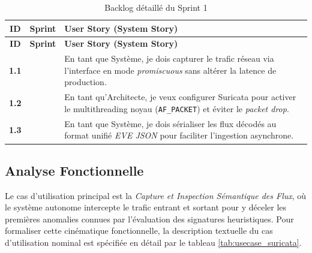 \renewcommand{\arraystretch}{1.25}
\small
\begin{xltabular}{\textwidth}{|c|l|>{\raggedright\arraybackslash}X|}

\caption{Backlog détaillé du Sprint 1}
\label{tab:backlog_sprint1} \\

\hline
{}
\textbf{ID} & \textbf{Sprint} & \textbf{User Story (System Story)} \\ \hline
\endfirsthead

\hline
{}
\textbf{ID} & \textbf{Sprint} & \textbf{User Story (System Story)} \\ \hline
\endhead

\textbf{1.1} &  & En tant que Système, je dois capturer le trafic réseau via l'interface en mode \textit{promiscuous} sans altérer la latence de production. \\  
\textbf{1.2} & & En tant qu'Architecte, je veux configurer Suricata pour activer le multithreading noyau (\texttt{AF\_PACKET}) et éviter le \textit{packet drop}. \\  
\textbf{1.3} & & En tant que Système, je dois sérialiser les flux décodés au format unifié \textit{EVE JSON} pour faciliter l'ingestion asynchrone. \\ \hline

\end{xltabular}

\subsection{Analyse Fonctionnelle}
Le cas d'utilisation principal est la \textit{Capture et Inspection Sémantique des Flux}, où le système autonome intercepte le trafic entrant et sortant pour y déceler les premières anomalies connues par l'évaluation des signatures heuristiques. Pour formaliser cette cinématique fonctionnelle, la description textuelle du cas d'utilisation nominal est spécifiée en détail par le tableau \ref{tab:usecase_suricata}.

